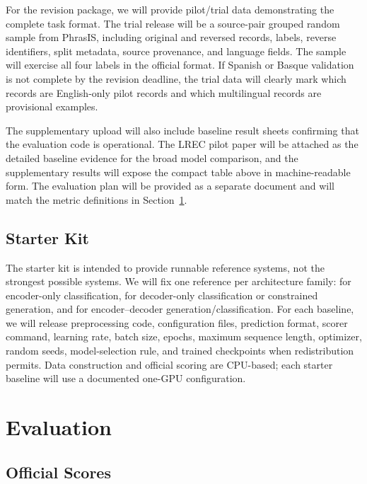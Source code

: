 \documentclass[11pt]{article}
\begin{document}
For the revision package, we will provide pilot/trial data demonstrating the complete task format.
The trial release will be a source-pair grouped random sample from PhrasIS, including original and reversed records, labels, reverse identifiers, split metadata, source provenance, and language fields.
The sample will exercise all four labels in the official format.
If Spanish or Basque validation is not complete by the revision deadline, the trial data will clearly mark which records are English-only pilot records and which multilingual records are provisional examples.

The supplementary upload will also include baseline result sheets confirming that the evaluation code is operational.
The LREC pilot paper will be attached as the detailed baseline evidence for the broad model comparison, and the supplementary results will expose the compact table above in machine-readable form.
The evaluation plan will be provided as a separate document and will match the metric definitions in Section~\ref{sec:evaluation}.

\subsection{Starter Kit}

The starter kit is intended to provide runnable reference systems, not the strongest possible systems.
We will fix one reference per architecture family:
 for encoder-only classification,  for decoder-only classification or constrained generation, and  for encoder--decoder generation/classification.
For each baseline, we will release preprocessing code, configuration files, prediction format, scorer command, learning rate, batch size, epochs, maximum sequence length, optimizer, random seeds, model-selection rule, and trained checkpoints when redistribution permits.
Data construction and official scoring are CPU-based; each starter baseline will use a documented one-GPU configuration.

\section{Evaluation}
\label{sec:evaluation}

\subsection{Official Scores}
\end{document}
